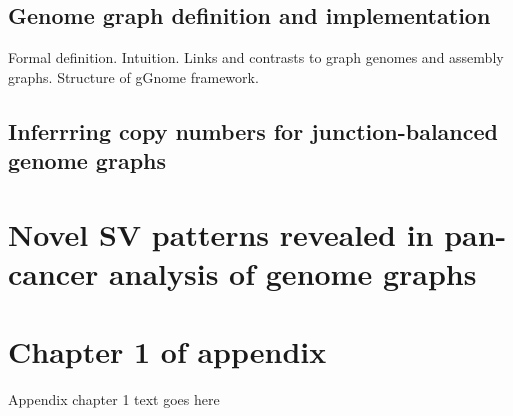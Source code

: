\documentclass[phd,tocprelim]{cornell}
\begin{document}
\section{Genome graph definition and implementation}
Formal definition. Intuition. Links and contrasts to graph genomes and assembly graphs. Structure of gGnome framework.

\section{Inferrring copy numbers for junction-balanced genome graphs}

\chapter{Novel SV patterns revealed in pan-cancer analysis of genome graphs}


\appendix
\chapter{Chapter 1 of appendix}
Appendix chapter 1 text goes here


\end{document}
